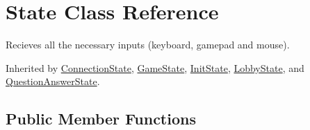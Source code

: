 \hypertarget{class_state}{\section{State Class Reference}
\label{class_state}
}


Recieves all the necessary inputs (keyboard, gamepad and mouse). 




Inherited by \hyperlink{class_connection_state}{Connection\-State}, \hyperlink{class_game_state}{Game\-State}, \hyperlink{class_init_state}{Init\-State}, \hyperlink{class_lobby_state}{Lobby\-State}, and \hyperlink{class_question_answer_state}{Question\-Answer\-State}.

\subsection*{Public Member Functions}
